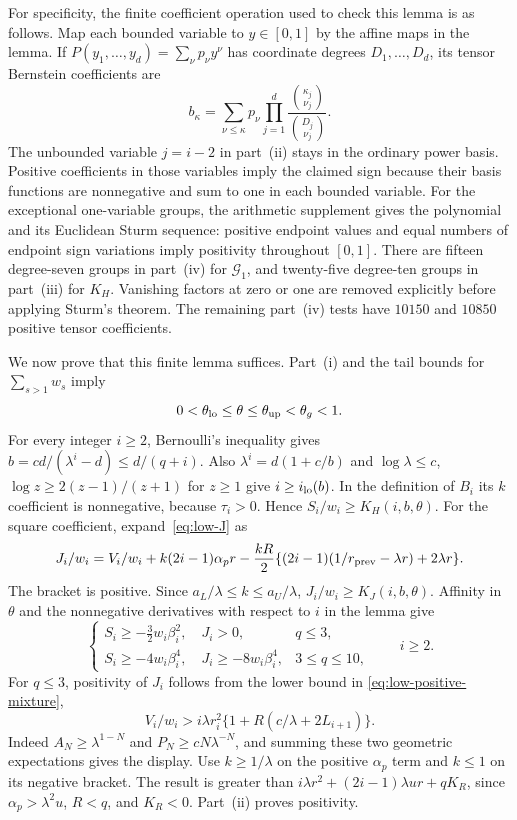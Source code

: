 For specificity, the finite coefficient operation used to check this
lemma is as follows.  Map each bounded variable to $y\in[0,1]$ by
the affine maps in the lemma.  If
$P(y_1,\ldots,y_d)=\sum_\nu p_\nu y^\nu$ has coordinate degrees
$D_1,\ldots,D_d$, its tensor Bernstein coefficients are
\begin{equation}\label{eq:low-Bernstein-transform}
 b_\kappa=\sum_{\nu\le\kappa}p_\nu
             \prod_{j=1}^d\frac{\binom{\kappa_j}{\nu_j}}
                                  {\binom{D_j}{\nu_j}}.
\end{equation}
The unbounded variable $j=i-2$ in part~(ii) stays in the ordinary
power basis.  Positive coefficients in those variables imply the
claimed sign because their basis functions are nonnegative and sum
to one in each bounded variable.  For the exceptional one-variable
groups, the arithmetic supplement gives the polynomial and its
Euclidean Sturm sequence: positive endpoint values and equal numbers
of endpoint sign variations imply positivity throughout $[0,1]$.
There are fifteen degree-seven groups in part~(iv) for
$\mathcal G_1$, and twenty-five degree-ten groups in part~(iii) for
$K_H$.  Vanishing factors at zero or one are removed explicitly
before applying Sturm's theorem.  The remaining part~(iv) tests have
$10150$ and $10850$ positive tensor coefficients.

We now prove that this finite lemma suffices.  Part~(i) and the
tail bounds for $\sum_{s>1}w_s$ imply
\[
 0<\theta_{\rm lo}\le\theta\le\theta_{\rm up}<\theta_g<1.
\]
For every integer $i\ge2$, Bernoulli's inequality gives
$b=cd/(\lambda^i-d)\le d/(q+i)$.  Also
$\lambda^i=d(1+c/b)$ and
$\log\lambda\le c$, $\log z\ge2(z-1)/(z+1)$ for $z\ge1$
give $i\ge i_{\rm lo}(b)$.  In the definition of $B_i$ its
$k$ coefficient is nonnegative, because $\tau_i>0$.
Hence $S_i/w_i\ge K_H(i,b,\theta)$.
For the square coefficient, expand~\eqref{eq:low-J} as
\[
 J_i/w_i=V_i/w_i+k(2i-1)\alpha_pr
       -\frac{kR}{2}\{(2i-1)(1/r_{\rm prev}-\lambda r)+2\lambda r\}.
\]
The bracket is positive.  Since $a_L/\lambda\le k\le a_U/\lambda$,
$J_i/w_i\ge K_J(i,b,\theta)$. Affinity in $\theta$ and the
nonnegative derivatives with respect to $i$ in the lemma give
\begin{equation}\label{eq:low-all-age-prices}
 \begin{cases}
 S_i\ge-\tfrac32w_i\beta_i^2,\quad J_i>0,&q\le3,\\
 S_i\ge-4w_i\beta_i^4,\quad J_i\ge-8w_i\beta_i^4,&3\le q\le10,
 \end{cases}\qquad i\ge2.
\end{equation}
For $q\le3$, positivity of $J_i$ follows from the lower bound in
\eqref{eq:low-positive-mixture},
\[
 V_i/w_i>i\lambda r_i^2
                      \{1+R(c/\lambda+2L_{i+1})\}.
\]
Indeed $A_N\ge\lambda^{1-N}$ and
$P_N\ge cN\lambda^{-N}$, and summing these two geometric
expectations gives the display.  Use $k\ge1/\lambda$ on the
positive $\alpha_p$ term and $k\le1$ on its negative bracket.
The result is greater than
$i\lambda r^2+(2i-1)\lambda ur+qK_R$, since
$\alpha_p>\lambda^2u$, $R<q$, and $K_R<0$.
Part~(ii) proves positivity.

